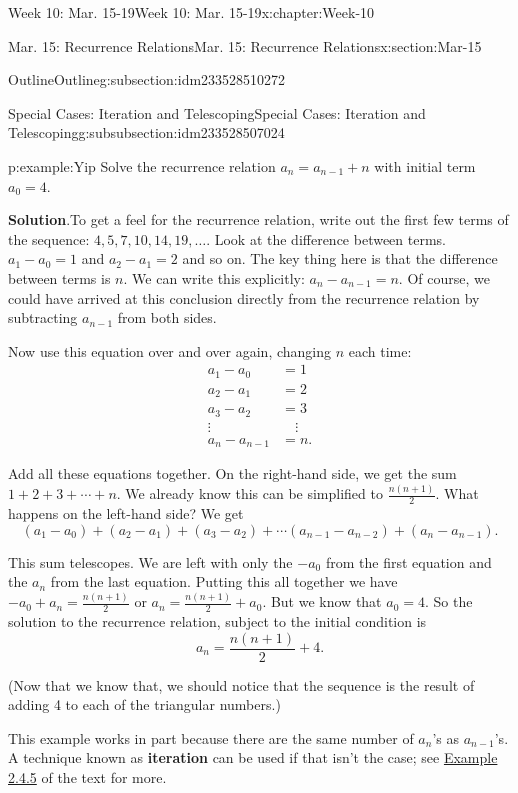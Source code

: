 \documentclass[oneside,10pt,]{book}
\newcommand{\blocktitlefont}{\relax}
\newcommand{\terminology}[1]{\textbf{#1}}
\numberwithin{equation}{section}
\newcommand{\amp}{&}
\begin{document}
\begin{chapterptx}{Week 10: Mar. 15-19}{}{Week 10: Mar. 15-19}{}{}{x:chapter:Week-10}
\begin{sectionptx}{Mar. 15: Recurrence Relations}{}{Mar. 15: Recurrence Relations}{}{}{x:section:Mar-15}
\begin{subsectionptx}{Outline}{}{Outline}{}{}{g:subsection:idm233528510272}
\begin{subsubsectionptx}{Special Cases: Iteration and Telescoping}{}{Special Cases: Iteration and Telescoping}{}{}{g:subsubsection:idm233528507024}
\begin{example}{}{p:example:Yip}
Solve the recurrence relation \(a_n = a_{n-1} + n\) with initial term \(a_0 = 4\).%
\par\smallskip%
\noindent\textbf{\blocktitlefont Solution}.\hypertarget{p:solution:pgA}{}\quad{}To get a feel for the recurrence relation, write out the first few terms of the sequence: \(4, 5, 7, 10, 14, 19, \ldots\). Look at the difference between terms. \(a_1 - a_0 = 1\) and \(a_2 - a_1 = 2\) and so on. The key thing here is that the difference between terms is \(n\). We can write this explicitly: \(a_n - a_{n-1} = n\). Of course, we could have arrived at this conclusion directly from the recurrence relation by subtracting \(a_{n-1}\) from both sides.%
\par
Now use this equation over and over again, changing \(n\) each time:%
\begin{align*}
a_1 - a_0 \amp = 1\\
a_2 - a_1 \amp = 2\\
a_3 - a_2 \amp = 3\\
\vdots \quad \amp \quad \vdots\\
a_n - a_{n-1} \amp = n\text{.}
\end{align*}
%
\par
Add all these equations together. On the right-hand side, we get the sum \(1 + 2 + 3 + \cdots + n\). We already know this can be simplified to \(\frac{n(n+1)}{2}\). What happens on the left-hand side? We get%
\begin{equation*}
(a_1 - a_0) + (a_2 - a_1) + (a_3 - a_2) + \cdots (a_{n-1} - a_{n-2})+ (a_n - a_{n-1})\text{.}
\end{equation*}
%
\par
This sum telescopes. We are left with only the \(-a_0\) from the first equation and the \(a_n\) from the last equation. Putting this all together we have \(-a_0 + a_n = \frac{n(n+1)}{2}\) or \(a_n = \frac{n(n+1)}{2} + a_0\). But we know that \(a_0 = 4\). So the solution to the recurrence relation, subject to the initial condition is%
\begin{equation*}
a_n = \frac{n(n+1)}{2} + 4\text{.}
\end{equation*}
%
\par
(Now that we know that, we should notice that the sequence is the result of adding 4 to each of the triangular numbers.) %
\end{example}
This example works in part because there are the same number of \(a_n\)'s as \(a_{n-1}\)'s. A technique known as \terminology{iteration} can be used if that isn't the case; see \href{http://discrete.openmathbooks.org/dmoi3/sec_recurrence.html\#kwH}{Example 2.4.5} of the text for more.%

\end{subsubsectionptx}
\end{subsectionptx}
\end{sectionptx}
\end{chapterptx}
\end{document}
